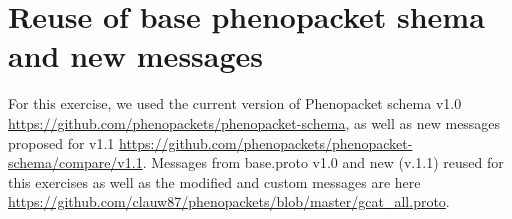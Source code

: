 \documentclass[a4paper, 10pt]{article}
\begin{document}

\section{Reuse of base phenopacket shema and new messages}

For this exercise, we used the current version of Phenopacket schema v1.0 \url{https://github.com/phenopackets/phenopacket-schema}, %
as well as new messages proposed for v1.1 \url{https://github.com/phenopackets/phenopacket-schema/compare/v1.1}.
Messages from base.proto v1.0 and new (v.1.1) reused for this exercises as well as the modified and custom messages are here \url{https://github.com/clauw87/phenopackets/blob/master/gcat_all.proto}.
\end{document}
